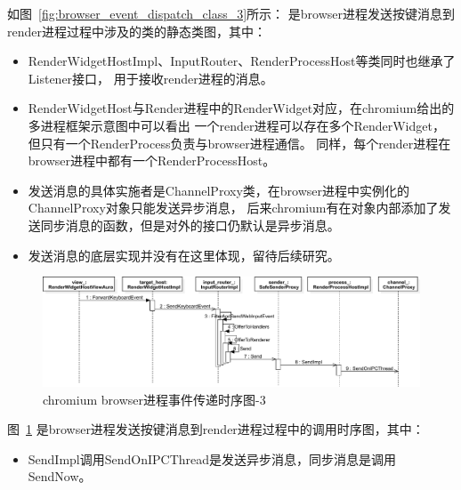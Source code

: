 \documentclass[12pt]{article}
\begin{document}
如图~\ref{fig:browser_event_dispatch_class_3}所示：
是browser进程发送按键消息到render进程过程中涉及的类的静态类图，其中：
\begin{itemize}
  \item RenderWidgetHostImpl、InputRouter、RenderProcessHost等类同时也继承了Listener接口，
  用于接收render进程的消息。
  \item RenderWidgetHost与Render进程中的RenderWidget对应，在chromium给出的多进程框架示意图中可以看出
  一个render进程可以存在多个RenderWidget，但只有一个RenderProcess负责与browser进程通信。
  同样，每个render进程在browser进程中都有一个RenderProcessHost。
  \item 发送消息的具体实施者是ChannelProxy类，在browser进程中实例化的ChannelProxy对象只能发送异步消息，
  后来chromium有在对象内部添加了发送同步消息的函数，但是对外的接口仍默认是异步消息。
  \item 发送消息的底层实现并没有在这里体现，留待后续研究。
\end{itemize}

\newpage
\begin{figure}[H] 
  \centering 
  \includegraphics[width=\textwidth]{image/browser_event_dispatch_sequence_3.pdf} 
  \caption{chromium browser进程事件传递时序图-3} \label{fig:browser_event_dispatch_sequence_3} 
\end{figure}

图~\ref{fig:browser_event_dispatch_sequence_3}
是browser进程发送按键消息到render进程过程中的调用时序图，其中：

\begin{itemize}
  \item SendImpl调用SendOnIPCThread是发送异步消息，同步消息是调用SendNow。
\end{itemize}
\end{document}
